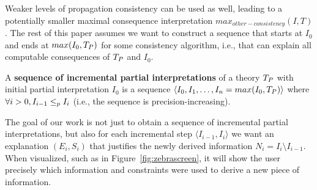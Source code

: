 Weaker levels of propagation consistency can be used as well, leading to a potentially smaller maximal consequence interpretation $max_{other-consistency}(I,T)$. 
The rest of this paper assumes we want to construct a sequence that starts at $I_0$ and ends at $max(I_0,T_P)$ for some consistency algorithm, i.e., that can explain all computable consequences of $T_P$ and $I_0$. %


% 




\begin{definition}
A \textbf{sequence of incremental partial interpretations} of a theory $T_P$ with initial partial interpretation $I_0$ is a sequence $\langle I_0, I_1, \ldots, I_n  = max(I_0,T_P)\rangle$ where $\forall i>0, I_{i-1} \leq_p I_{i}$ (i.e., the sequence is precision-increasing).
\end{definition} 

The goal of our work is not just to obtain a sequence of incremental partial interpretations, but also 
% 
for each incremental step $\langle I_{i-1}, I_i \rangle$ we want an explanation $(E_i,S_i)$ that justifies the newly derived information $N_i = I_i \setminus I_{i-1}$. When visualized, such as in Figure~\ref{fig:zebrascreen}, it will show the user precisely which information and constraints were used to derive a new piece of information.

